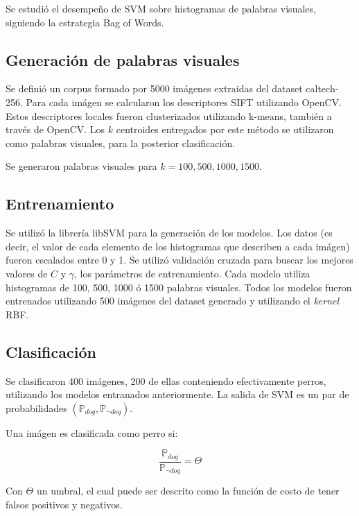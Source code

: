 \documentclass[12pt]{article}
\begin{document}
Se estudió el desempeño de SVM sobre histogramas de palabras visuales, siguiendo la estrategia Bag of Words.

\subsection{Generación de palabras visuales}

Se definió un corpus formado por 5000 imágenes extraidas del dataset
caltech-256\cite{griffin2007caltech}. Para cada imágen se calcularon los
descriptores SIFT utilizando OpenCV.
Estos descriptores locales fueron clusterizados utilizando k-means, también a
través de OpenCV. Los $k$ centroides entregados por este método se utilizaron como
palabras visuales, para la posterior clasificación.

Se generaron palabras visuales para $k = 100, 500, 1000, 1500$.

\subsection{Entrenamiento}

Se utilizó la librería libSVM para la generación de los modelos. Los datos (es
decir, el valor de cada elemento de los histogramas que describen a cada imágen)
fueron escalados entre 0 y 1. Se utilizó validación cruzada para buscar los
mejores valores de $C$ y $\gamma$, los parámetros de entrenamiento. Cada modelo
utiliza histogramas de 100, 500, 1000 ó 1500 palabras visuales. Todos los
modelos fueron entrenados utilizando 500 imágenes del dataset generado y
utilizando el \emph{kernel} RBF.

\subsection{Clasificación}

Se clasificaron 400 imágenes, 200 de ellas conteniendo efectivamente perros,
utilizando los modelos entranados anteriormente. La salida de SVM es un par de
probabilidades $(\mathbb{P}_{dog},\mathbb{P}_{\neg dog})$.

Una imágen es clasificada como perro si:

\begin{equation}
    \frac{ \mathbb{P}_{dog} }{ \mathbb{P}_{\neg dog} } =
    \Theta
\end{equation}

Con $\Theta$ un umbral, el cual puede ser descrito como la función de costo de tener falsos positivos y negativos.
\end{document}
